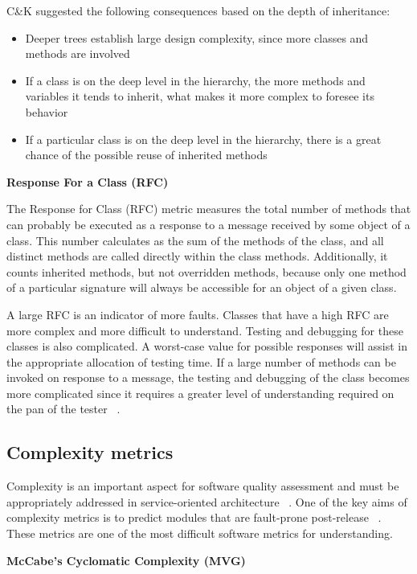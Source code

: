 C\&K suggested the following consequences based on the depth of inheritance:
\begin{itemize}
	\item Deeper trees establish large design complexity, since more classes and methods are involved
	\item If a class is on the deep level in the hierarchy, the more methods and variables it tends to inherit, what makes it more complex to foresee its behavior
	\item If a particular class is on the deep level in the hierarchy, there is a great chance of the possible reuse of inherited methods 
\end{itemize}

\textbf{Response For a Class (RFC)} 

The Response for Class (RFC) metric measures the total number of methods that can probably be executed as a response to a message received by some object of a class. This number calculates as the sum of the methods of the class, and all distinct methods are called directly within the class methods. Additionally, it counts inherited methods, but not overridden methods, because only one method of a particular signature will always be accessible for an object of a given class.

A large RFC is an indicator of more faults. Classes that have a high RFC are more complex and more difficult to understand. Testing and debugging for these classes is also complicated. A worst-case value for possible responses will assist in the appropriate allocation of testing time. If a large number of methods can be invoked on response to a message, the testing and debugging of the class becomes more complicated since it requires a greater level of understanding required on the pan of the tester ~\cite{ck}.
\subsection{Complexity metrics}

Complexity is an important aspect for software quality assessment and must be appropriately addressed in service-oriented architecture ~\cite{complexity}. One of the key aims of complexity  metrics is to predict modules that are fault-prone post-release ~\cite{complexity2}. These metrics are one of the most difficult software metrics for understanding.

\textbf{McCabe's Cyclomatic Complexity (MVG)}

